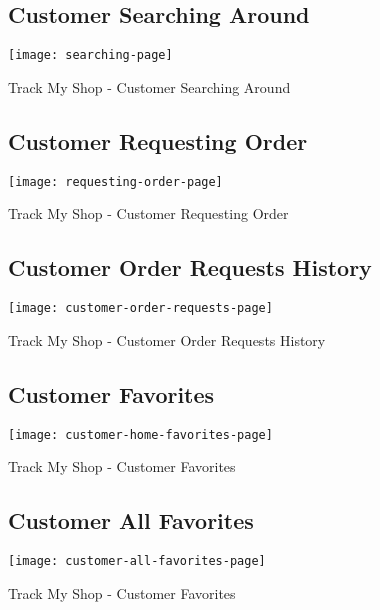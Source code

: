 \begin{figure}[h]
	\subsection{Customer Searching Around \\}
	\centering
	\texttt{[image: searching-page]}
	\caption{Track My Shop - Customer Searching Around}
\end{figure}

\vspace{1cm}

\begin{figure}[h]
	\subsection{Customer Requesting Order \\}
	\centering
	\texttt{[image: requesting-order-page]}
	\caption{Track My Shop - Customer Requesting Order}
\end{figure}
\newpage

\begin{figure}[h]
	\subsection{Customer Order Requests History \\}
	\centering
	\texttt{[image: customer-order-requests-page]}
	\caption{Track My Shop - Customer Order Requests History}
\end{figure}

\begin{figure}[h]
	\subsection{Customer Favorites \\}
	\centering
	\texttt{[image: customer-home-favorites-page]}
	\caption{Track My Shop - Customer Favorites}
\end{figure}
\pagebreak
\begin{figure}[h]
	\subsection{Customer All Favorites}
	\centering
	\texttt{[image: customer-all-favorites-page]}
	\caption{Track My Shop - Customer Favorites}
\end{figure}


